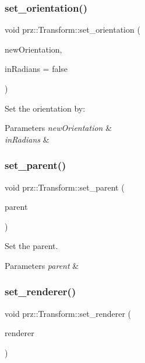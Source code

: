 \subsubsection{\texorpdfstring{set\_orientation()}{set\_orientation()}\hspace{0.1cm}{\footnotesize\ttfamily [2/2]}}
{\footnotesize\ttfamily void prz\+::\+Transform\+::set\+\_\+orientation (\begin{DoxyParamCaption}\item[{const P\+Vec3 \&}]{new\+Orientation,  }\item[{bool}]{in\+Radians = {\ttfamily false} }\end{DoxyParamCaption})}



Set the orientation by\+: 


\begin{DoxyParams}{Parameters}
{\em new\+Orientation} & \\
\hline
{\em in\+Radians} & \\
\hline
\end{DoxyParams}
\mbox{\label{classprz_1_1_transform_a064010404c7ea3de8bf7588f54349de4}} 
\subsubsection{\texorpdfstring{set\_parent()}{set\_parent()}}
{\footnotesize\ttfamily void prz\+::\+Transform\+::set\+\_\+parent (\begin{DoxyParamCaption}\item[{\mbox{\hyperlink{classprz_1_1_transform}{Transform}} $\ast$}]{parent }\end{DoxyParamCaption})}



Set the parent. 


\begin{DoxyParams}{Parameters}
{\em parent} & \\
\hline
\end{DoxyParams}
\mbox{\label{classprz_1_1_transform_a67be0fd111f99b7022637309be974dce}} 
\subsubsection{\texorpdfstring{set\_renderer()}{set\_renderer()}}
{\footnotesize\ttfamily void prz\+::\+Transform\+::set\+\_\+renderer (\begin{DoxyParamCaption}\item[{\mbox{\hyperlink{classprz_1_1_renderer}{Renderer}} $\ast$}]{renderer }\end{DoxyParamCaption})}



